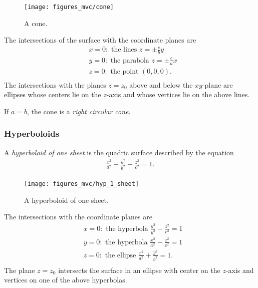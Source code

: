 \documentclass[12pt,letterpaper,reqno]{article}
\numberwithin{equation}{section}
\begin{document}
{\begin{figure}[h]
	\begin{center}
		\texttt{[image: figures\_mvc/cone]}
	\end{center}
	\caption{A cone.}
\end{figure}

The intersections of the surface with the coordinate planes are
\begin{align*}
	&x=0: \text{ the lines } z=\pm \frac{c}{b}y \\
	&y=0: \text{ the parabola } z=\pm \frac{c}{a}x \\
	&z=0: \text{ the point } (0,0,0). \\
\end{align*}
The intersections with the planes $z=z_0$ above and below the $xy$-plane are ellipses whose centers lie on the $z$-axis and whose vertices lie on the above lines. 

If $a=b$, the cone is a \emph{right circular cone}.

\subsubsection{Hyperboloids}
\begin{defn}
	A \emph{hyperboloid of one sheet} is the quadric surface described by the equation
	\begin{align*}
		\frac{x^2}{a^2}+\frac{y^2}{b^2}-\frac{z^2}{c^2}=1.
	\end{align*}
\end{defn}

\begin{figure}[h]
	\begin{center}
		\texttt{[image: figures\_mvc/hyp\_1\_sheet]}
	\end{center}
	\caption{A hyperboloid of one sheet.}
\end{figure}

The intersections with the coordinate planes are
\begin{align*}
	&x=0: \text{ the hyperbola } \frac{y^2}{b^2}-\frac{z^2}{c^2}=1 \\
	&y=0: \text{ the hyperbola } \frac{x^2}{a^2}-\frac{z^2}{c^2}=1 \\
	&z=0: \text{ the ellipse } \frac{x^2}{a^2}+\frac{y^2}{b^2}=1. \\
\end{align*}
The plane $z=z_0$ intersects the surface in an ellipse with center on the $z$-axis and vertices on one of the above hyperbolas.

}
\end{document}
